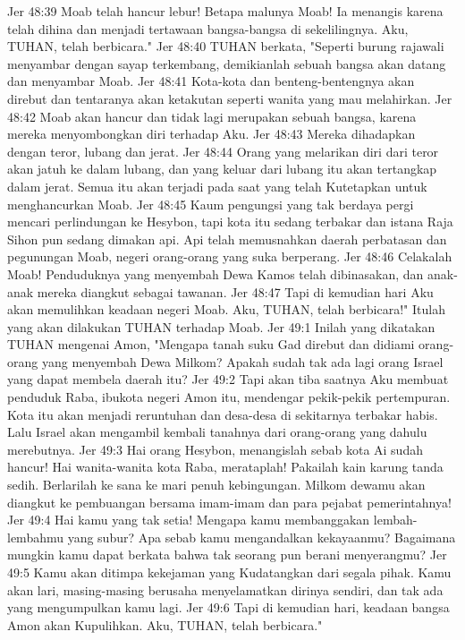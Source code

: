 Jer 48:39  Moab telah hancur lebur! Betapa malunya Moab! Ia menangis karena telah dihina dan menjadi tertawaan bangsa-bangsa di sekelilingnya. Aku, TUHAN, telah berbicara."
Jer 48:40  TUHAN berkata, "Seperti burung rajawali menyambar dengan sayap terkembang, demikianlah sebuah bangsa akan datang dan menyambar Moab.
Jer 48:41  Kota-kota dan benteng-bentengnya akan direbut dan tentaranya akan ketakutan seperti wanita yang mau melahirkan.
Jer 48:42  Moab akan hancur dan tidak lagi merupakan sebuah bangsa, karena mereka menyombongkan diri terhadap Aku.
Jer 48:43  Mereka dihadapkan dengan teror, lubang dan jerat.
Jer 48:44  Orang yang melarikan diri dari teror akan jatuh ke dalam lubang, dan yang keluar dari lubang itu akan tertangkap dalam jerat. Semua itu akan terjadi pada saat yang telah Kutetapkan untuk menghancurkan Moab.
Jer 48:45  Kaum pengungsi yang tak berdaya pergi mencari perlindungan ke Hesybon, tapi kota itu sedang terbakar dan istana Raja Sihon pun sedang dimakan api. Api telah memusnahkan daerah perbatasan dan pegunungan Moab, negeri orang-orang yang suka berperang.
Jer 48:46  Celakalah Moab! Penduduknya yang menyembah Dewa Kamos telah dibinasakan, dan anak-anak mereka diangkut sebagai tawanan.
Jer 48:47  Tapi di kemudian hari Aku akan memulihkan keadaan negeri Moab. Aku, TUHAN, telah berbicara!" Itulah yang akan dilakukan TUHAN terhadap Moab.
Jer 49:1  Inilah yang dikatakan TUHAN mengenai Amon, "Mengapa tanah suku Gad direbut dan didiami orang-orang yang menyembah Dewa Milkom? Apakah sudah tak ada lagi orang Israel yang dapat membela daerah itu?
Jer 49:2  Tapi akan tiba saatnya Aku membuat penduduk Raba, ibukota negeri Amon itu, mendengar pekik-pekik pertempuran. Kota itu akan menjadi reruntuhan dan desa-desa di sekitarnya terbakar habis. Lalu Israel akan mengambil kembali tanahnya dari orang-orang yang dahulu merebutnya.
Jer 49:3  Hai orang Hesybon, menangislah sebab kota Ai sudah hancur! Hai wanita-wanita kota Raba, merataplah! Pakailah kain karung tanda sedih. Berlarilah ke sana ke mari penuh kebingungan. Milkom dewamu akan diangkut ke pembuangan bersama imam-imam dan para pejabat pemerintahnya!
Jer 49:4  Hai kamu yang tak setia! Mengapa kamu membanggakan lembah-lembahmu yang subur? Apa sebab kamu mengandalkan kekayaanmu? Bagaimana mungkin kamu dapat berkata bahwa tak seorang pun berani menyerangmu?
Jer 49:5  Kamu akan ditimpa kekejaman yang Kudatangkan dari segala pihak. Kamu akan lari, masing-masing berusaha menyelamatkan dirinya sendiri, dan tak ada yang mengumpulkan kamu lagi.
Jer 49:6  Tapi di kemudian hari, keadaan bangsa Amon akan Kupulihkan. Aku, TUHAN, telah berbicara."
